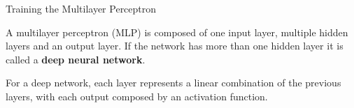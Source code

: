 \documentclass[10pt, table, dvipsnames,xcdraw, handout]{beamer}
\def\layersep{2.5cm}
\begin{document}
\begin{frame}[fragile]{Training the Multilayer Perceptron}
\begin{minipage}[t][0.5\textheight][t]{\textwidth}
  \end{minipage}
  \vfill
\begin{minipage}[t][0.5\textheight][t]{\textwidth}
A multilayer perceptron (MLP) is composed of one input layer, multiple hidden layers and an output layer. If the network has more than one hidden layer it is called a \textbf{deep neural network}.\newline

For a deep network, each layer represents a linear combination of the previous layers, with each output composed by an activation function.  
\end{minipage}
\end{frame}
\end{document}
